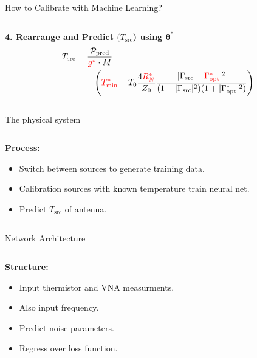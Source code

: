 \documentclass[aspectratio=169]{beamer}
\begin{document}
\begin{frame}{How to Calibrate with Machine Learning?}
\begin{columns}
\begin{column}{0.5\textwidth}
			\textbf{4. Rearrange and Predict $(T_{\text{src}}$) using $\boldsymbol{\theta}^{*}$}
			\begin{align}
				T_{\text{src}} & = \frac{\mathcal{P}_{\text{pred}}}{\textcolor{red}{g^*} \cdot M} \nonumber \\
				               & \quad - \left( \textcolor{red}{T_{\text{min}}^*}
				+ T_0 \frac{4\textcolor{red}{R_N^*}}{Z_0} \frac{|\Gamma_{\text{src}} - \textcolor{red}{\Gamma_{\text{opt}}^*}|^2}{(1 - |\Gamma_{\text{src}}|^2)(1 + |\Gamma_{\text{opt}}^*|^2)} \right)
			\end{align}
			\vfill
		\end{column}
	\end{columns}
\end{frame}

\begin{frame}{The physical system}
	\begin{columns}
		\begin{column}{0.3\textwidth}
			\textbf{Process:}
			\begin{itemize}
				\item Switch between sources to generate training data.
				\item Calibration sources with known temperature train neural net.
				\item Predict $T_{\text{src}}$ of antenna.
			\end{itemize}
		\end{column}

		\begin{column}{0.7\textwidth}
			\begin{figure}
				\centering
				
			\end{figure}
		\end{column}
	\end{columns}
	\vfill
\end{frame}

\begin{frame}{Network Architecture}
	\begin{columns}
		\begin{column}{0.35\textwidth}
			\textbf{Structure:}
			\begin{itemize}
				\item Input thermistor and VNA measurments.
				\item Also input frequency.
				\item Predict noise parameters.
				\item Regress over loss function.
			\end{itemize}
		\end{column}

		\begin{column}{0.65\textwidth}
			\begin{figure}
				\centering
				
			\end{figure}
		\end{column}
	\end{columns}
	\vfill
\end{frame}
\end{document}
